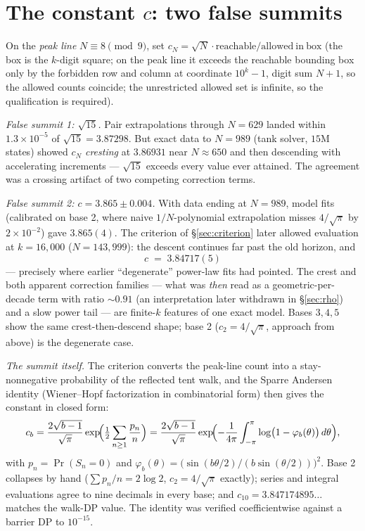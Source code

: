 \documentclass[11pt]{article}
\theoremstyle{definition}
\theoremstyle{remark}
\begin{document}
\section{The constant \texorpdfstring{$c$}{c}: two false summits}\label{sec:c}

On the \emph{peak line} $N\equiv 8 \pmod 9$, set
$c_N=\sqrt{N}\cdot\mathrm{reachable}/\mathrm{allowed\ in\ box}$ (the box is
the $k$-digit square; on the peak line it exceeds the reachable bounding box
only by the forbidden row and column at coordinate $10^k-1$, digit sum $N+1$,
so the allowed counts coincide; the unrestricted allowed set is infinite, so
the qualification is required).

\emph{False summit 1: $\sqrt{15}$.} Pair extrapolations through $N=629$ landed
within $1.3\times10^{-5}$ of $\sqrt{15}=3.87298$. But exact data to $N=989$
(tank solver, $15$M states) showed $c_N$ \emph{cresting} at $3.86931$ near
$N\approx650$ and then descending with accelerating increments ---
$\sqrt{15}$ exceeds every value ever attained. The agreement was a crossing
artifact of two competing correction terms.

\emph{False summit 2: $c=3.865\pm0.004$.} With data ending at $N=989$, model
fits (calibrated on base 2, where naive $1/N$-polynomial extrapolation misses
$4/\sqrt{\pi}$ by $2\times10^{-2}$) gave $3.865(4)$. The criterion of
\S\ref{sec:criterion} later allowed evaluation at $k=16{,}000$
($N=143{,}999$): the descent continues far past the old horizon, and
\[
c \;=\; 3.84717(5)
\]
--- precisely where earlier ``degenerate'' power-law fits had pointed. The crest
and both apparent correction families --- what was \emph{then} read as a
geometric-per-decade term with ratio ${\sim}0.91$ (an interpretation later
withdrawn in \S\ref{sec:rho}) and a slow power tail --- are finite-$k$
features of one exact model.
Bases $3,4,5$ show the same crest-then-descend shape; base 2
($c_2=4/\sqrt{\pi}$, approach from above) is the degenerate case.

\emph{The summit itself.} The criterion converts the peak-line count into a
stay-nonnegative probability of the reflected tent walk, and the Sparre
Andersen identity (Wiener--Hopf factorization in combinatorial form) then gives
the constant in closed form:
\[
c_b=\frac{2\sqrt{b-1}}{\sqrt{\pi}}
\exp\!\Bigl(\tfrac12\sum_{n\ge1}\frac{p_n}{n}\Bigr)
=\frac{2\sqrt{b-1}}{\sqrt{\pi}}
\exp\!\Bigl(-\frac{1}{4\pi}\int_{-\pi}^{\pi}
\log\bigl(1-\varphi_b(\theta)\bigr)\,d\theta\Bigr),
\]
with $p_n=\Pr(S_n{=}0)$ and
$\varphi_b(\theta)=\bigl(\sin(b\theta/2)/(b\sin(\theta/2))\bigr)^2$. Base 2
collapses by hand ($\sum p_n/n=2\log2$, $c_2=4/\sqrt{\pi}$ exactly); series and
integral evaluations agree to nine decimals in every base; and
$c_{10}=3.847174895\ldots$ matches the walk-DP value. The identity was verified
coefficientwise against a barrier DP to $10^{-15}$.
\end{document}
